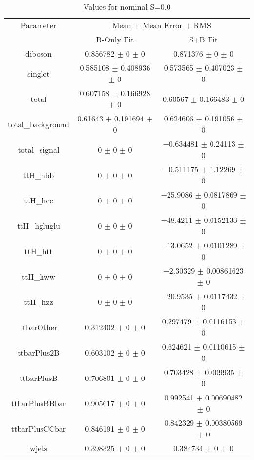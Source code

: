\begin{table}
\centering
\caption{Values for nominal S=0.0}
\begin{tabular}{ccc}
\toprule
Parameter & \multicolumn{2}{c}{Mean $\pm$ Mean Error $\pm$ RMS}\\
 & B-Only Fit & S+B Fit\\
\midrule
diboson & \num{0.856782} $\pm$ \num{0} $\pm$ \num{0} & \num{0.871376} $\pm$ \num{0} $\pm$ \num{0}\\
singlet & \num{0.585108} $\pm$ \num{0.408936} $\pm$ \num{0} & \num{0.573565} $\pm$ \num{0.407023} $\pm$ \num{0}\\
total & \num{0.607158} $\pm$ \num{0.166928} $\pm$ \num{0} & \num{0.60567} $\pm$ \num{0.166483} $\pm$ \num{0}\\
total\_background & \num{0.61643} $\pm$ \num{0.191694} $\pm$ \num{0} & \num{0.624606} $\pm$ \num{0.191056} $\pm$ \num{0}\\
total\_signal & \num{0} $\pm$ \num{0} $\pm$ \num{0} & \num{-0.634481} $\pm$ \num{0.24113} $\pm$ \num{0}\\
ttH\_hbb & \num{0} $\pm$ \num{0} $\pm$ \num{0} & \num{-0.511175} $\pm$ \num{1.12269} $\pm$ \num{0}\\
ttH\_hcc & \num{0} $\pm$ \num{0} $\pm$ \num{0} & \num{-25.9086} $\pm$ \num{0.0817869} $\pm$ \num{0}\\
ttH\_hgluglu & \num{0} $\pm$ \num{0} $\pm$ \num{0} & \num{-48.4211} $\pm$ \num{0.0152133} $\pm$ \num{0}\\
ttH\_htt & \num{0} $\pm$ \num{0} $\pm$ \num{0} & \num{-13.0652} $\pm$ \num{0.0101289} $\pm$ \num{0}\\
ttH\_hww & \num{0} $\pm$ \num{0} $\pm$ \num{0} & \num{-2.30329} $\pm$ \num{0.00861623} $\pm$ \num{0}\\
ttH\_hzz & \num{0} $\pm$ \num{0} $\pm$ \num{0} & \num{-20.9535} $\pm$ \num{0.0117432} $\pm$ \num{0}\\
ttbarOther & \num{0.312402} $\pm$ \num{0} $\pm$ \num{0} & \num{0.297479} $\pm$ \num{0.0116153} $\pm$ \num{0}\\
ttbarPlus2B & \num{0.603102} $\pm$ \num{0} $\pm$ \num{0} & \num{0.624621} $\pm$ \num{0.0110615} $\pm$ \num{0}\\
ttbarPlusB & \num{0.706801} $\pm$ \num{0} $\pm$ \num{0} & \num{0.703428} $\pm$ \num{0.009935} $\pm$ \num{0}\\
ttbarPlusBBbar & \num{0.905617} $\pm$ \num{0} $\pm$ \num{0} & \num{0.992541} $\pm$ \num{0.00690482} $\pm$ \num{0}\\
ttbarPlusCCbar & \num{0.846191} $\pm$ \num{0} $\pm$ \num{0} & \num{0.842329} $\pm$ \num{0.00380569} $\pm$ \num{0}\\
wjets & \num{0.398325} $\pm$ \num{0} $\pm$ \num{0} & \num{0.384734} $\pm$ \num{0} $\pm$ \num{0}\\
\bottomrule
\end{tabular}
\end{table}